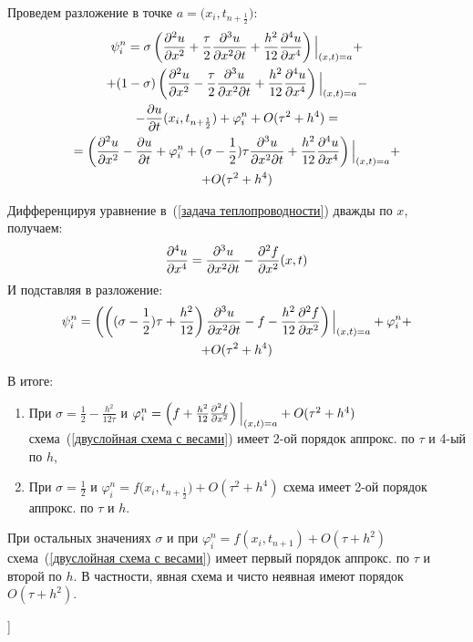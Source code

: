 \begin{Commentwhite}
\newcommand*{\point}{\ensuremath{(x_i,t_{n+\frac{1}{2}}})}
Проведем разложение в точке $a=\point$:
\begin{gather*}
    \psi_i^n = \sigma\left( \deltwo{u}{x} + \frac{\tau}{2}\frac{\partial^3 u}{\partial x^2 \partial t} + \frac{h^2}{12}\deln{u}{x}{4} \right)\Big|_{(x,t)=a} + 
    \\
    + (1 - \sigma)\left( \deltwo{u}{x} - \frac{\tau}{2}\frac{\partial^3 u}{\partial x^2 \partial t} + \frac{h^2}{12}\deln{u}{x}{4} \right)\Big|_{(x,t)=a} -
    \\
    - \del{u}{t}\point + \varphi_i^n + O(\tau^2 + h^4) = 
    \\
    = \left(\deltwo{u}{x} - \del{u}{t} + \varphi_i^n + (\sigma - \frac{1}{2})\tau\frac{\partial^3 u}{\partial x^2 \partial t} + \frac{h^2}{12}\deln{u}{x}{4}\right)\Big|_{(x,t)=a} + 
    \\
    + O(\tau^2 + h^4)
\end{gather*}

Дифференцируя уравнение в~(\ref{задача теплопроводности}) дважды по $x$, получаем:
$$\frac{\partial^{4} u}{\partial x^{4}} = \frac{\partial^3 u}{\partial x^2 \partial t} - \frac{\partial^2 f}{\partial x^2}(x,t)$$
И подставляя в разложение:
\begin{gather*}
    \psi_i^n = \left( \left((\sigma - \frac{1}{2})\tau + \frac{h^2}{12}\right)\frac{\partial^3 u}{\partial x^2 \partial t} - f -\frac{h^2}{12}\frac{\partial^2 f}{\partial x^2} \right)\Big|_{(x,t)=a} + \varphi_i^n +
    \\
    + O(\tau^2 + h^4)
\end{gather*}

В итоге:
\begin{enumerate}
    \item При $\sigma = \frac{1}{2} - \frac{h^2}{12\tau}$ и $\varphi_i^n = \left(f + \frac{h^2}{12}\frac{\partial^2 f}{\partial x^2}\right)\Big|_{(x,t)=a} + O(\tau^2 + h^4)$ схема~(\ref{двуслойная схема с весами}) имеет 2-ой порядок аппрокс. по $\tau$ и 4-ый по $h$,
    \item При $\sigma = \frac{1}{2}$ и $\varphi_i^n = f\point + O(\tau^2 + h^4)$ схема имеет 2-ой порядок аппрокс. по $\tau$ и $h$.
\end{enumerate}

При остальных значениях $\sigma$ и при $\varphi_i^n = f(x_i, t_{n+1}) + O(\tau + h^2)$ схема~(\ref{двуслойная схема с весами}) имеет первый порядок аппрокс. по $\tau$ и второй по $h$. В частности, явная схема и чисто неявная имеют порядок $O(\tau + h^2)$.
\end{Commentwhite}


\bigbreak
[\cite{chmmf}]
[\cite[259-261]{tickets2022}]
